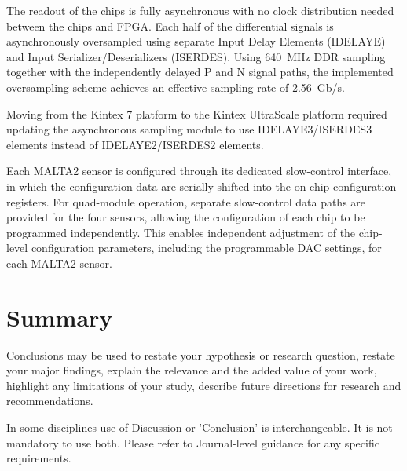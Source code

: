 \documentclass[pdftex,twocolumn,epjc3]{svjour3}          %
\begin{document}
The readout of the chips is fully asynchronous with no clock distribution needed between the chips and FPGA.
%
Each half of the differential signals is asynchronously oversampled using separate Input Delay Elements (IDELAYE) and Input Serializer/Deserializers (ISERDES). Using 640~MHz DDR sampling together with the independently delayed P and N signal paths, the implemented oversampling scheme achieves an effective sampling rate of 2.56~Gb/s.

Moving from the Kintex 7 platform to the Kintex UltraScale platform required updating the asynchronous sampling module to use IDELAYE3/ISERDES3 elements instead of IDELAYE2/ISERDES2 elements.

%
Each MALTA2 sensor is configured through its dedicated slow-control interface, in which the configuration data are serially shifted into the on-chip configuration registers. For quad-module operation, separate slow-control data paths are provided for the four sensors, allowing the configuration of each chip to be programmed independently. This enables independent adjustment of the chip-level configuration parameters, including the programmable DAC settings, for each MALTA2 sensor.




\section{Summary}\label{sec:sum}

Conclusions may be used to restate your hypothesis or research question, restate your major findings, explain the relevance and the added value of your work, highlight any limitations of your study, describe future directions for research and recommendations. 

In some disciplines use of Discussion or 'Conclusion' is interchangeable. It is not mandatory to use both. Please refer to Journal-level guidance for any specific requirements. 
\end{document}
